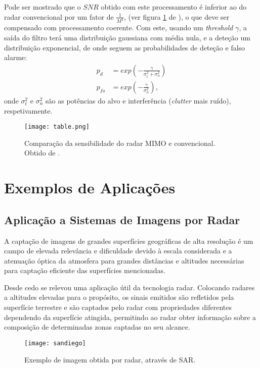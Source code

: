 \documentclass[purist,portuguese]{ist-report}
\begin{document}
Pode ser mostrado que o $SNR$ obtido com este processamento é inferior ao do radar convencional por um fator de $\frac{1}{M^2}$, (ver figura \ref{fig:tabela} de \cite{mimoradarbook}), o que deve ser compensado com processamento coerente.
Com este, usando um \textit{threshold} $\gamma$, a saída do filtro terá uma distribuição gaussiana com média nula, e a deteção um distribuição exponencial, de onde seguem as probabilidades de deteção e falso alarme:
\begin{align}
  p_d &= exp\left( -\frac{\gamma}{\sigma_t^2 + \sigma_n^2} \right) \label{eq:pd} \\
  p_{fa} &= exp\left( -\frac{\gamma}{\sigma_n^2} \right) \label{eq:pfa},
\end{align}
onde $\sigma_t^2$ e $\sigma_n^2$ são as potências do alvo e interferência (\textit{clutter} mais ruído), respetivamente.

\begin{figure}[ht]
  \centering
  \texttt{[image: table.png]}
  \caption{Comparação da sensibilidade do radar MIMO e convencional. Obtido de \cite{mimoradarbook}.}
  \label{fig:tabela}
\end{figure}

\section{Exemplos de Aplicações}

\subsection{Aplicação a Sistemas de Imagens por Radar}

A captação de imagens de grandes superfícies geográficas de alta resolução é um campo de elevada relevância e dificuldade devido à escala considerada e a atenuação óptica da atmosfera para grandes distâncias e altitudes necessárias para captação eficiente das superfícies mencionadas.

Desde cedo se relevou uma aplicação útil da tecnologia radar. Colocando radares a altitudes elevadas para o propósito, os sinais emitidos são refletidos pela superfície terrestre e são captados pelo radar com propriedades diferentes dependendo da superfície atingida, permitindo ao radar obter informação sobre a composição de determinadas zonas captadas no seu alcance.

\begin{figure}[ht]
	\centering
	\texttt{[image: sandiego]}
	\caption{Exemplo de imagem obtida por radar, através de SAR.}
	\label{fig:sandiego}
\end{figure}
\end{document}
